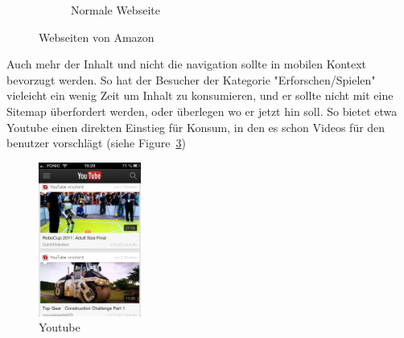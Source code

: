 \begin{figure}
\begin{subfigure}[b]{0.6\textwidth}
		\caption{Normale Webseite}\label{fig:amazonFull}
	\end{subfigure}
	\caption{Webseiten von Amazon}\label{fig:amazonSites}
\end{figure}

Auch mehr der Inhalt und nicht die navigation sollte in mobilen Kontext bevorzugt werden\cite[Seite 52]{mobileFirst}. So hat der Besucher der Kategorie "Erforschen/Spielen" vieleicht ein wenig Zeit um Inhalt zu konsumieren, und er sollte nicht mit eine Sitemap überfordert werden, oder überlegen wo er jetzt hin soll. So bietet etwa Youtube einen direkten Einstieg für Konsum, in den es schon Videos für den benutzer vorschlägt (siehe Figure~\ref{fig:youtube})

\begin{figure}
	\begin{center}
	\includegraphics[width=0.3\textwidth]{img/youtube.png}
	\caption{Youtube}\label{fig:youtube}
\end{center}
\end{figure}




